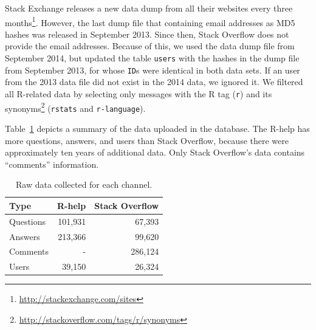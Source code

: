 \documentclass{sig-alternate-05-2015}
\begin{document}
Stack Exchange releases a new data dump from all their websites every three months\footnote{\url{http://stackexchange.com/sites}}.
However, the last dump file that containing email addresses as MD5 hashes was released in September 2013.
Since then, Stack Overflow does not provide the email addresses.
Because of this, we used the data dump file from September 2014, but updated the table \texttt{users} with the hashes in the dump file from September 2013, for whose \texttt{ID}s were identical in both data sets.
If an user from the 2013 data file did not exist in the 2014 data, we ignored it.
We filtered all R-related data by selecting only messages with the R tag (\texttt{r}) and its synonyms\footnote{\url{http://stackoverflow.com/tags/r/synonyms}} (\texttt{rstats} and \texttt{r-language}).

	Table~\ref{table:data} depicts a summary of the data uploaded in the database.
	The R-help has more questions, answers, and users than Stack Overflow, because there were approximately ten years of additional data.
	Only Stack Overflow's data contains ``comments'' information. %

	\begin{table}[!htb]
	  \centering
      \caption{Raw data collected for each channel.}
      \begin{small}
        \begin{tabular}{lrr}
	        \toprule
	        Type          &  R-help & Stack Overflow \\
	        \midrule
	        Questions     & 101,931 &  67,393 \\
	        Answers       & 213,366 &  99,620 \\
	        Comments      &       - & 286,124 \\
	        Users         &  39,150 &  26,324 \\
	        \bottomrule
        \end{tabular}
      \end{small}
	  \label{table:data}
	\end{table}
\end{document}
